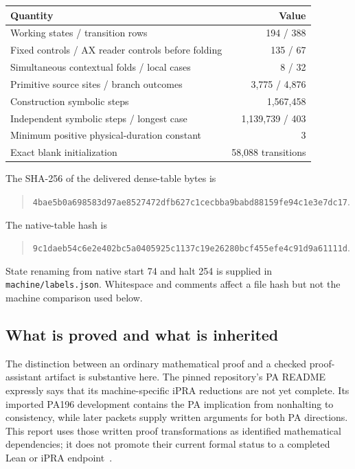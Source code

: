 \documentclass[11pt,letterpaper]{article}
\newcommand{\file}[1]{\nolinkurl{#1}}
\begin{document}
\begin{center}
\begin{tabular}{lr}
\toprule Quantity & Value\\\midrule
Working states / transition rows & 194 / 388\\
Fixed controls / AX reader controls before folding & 135 / 67\\
Simultaneous contextual folds / local cases & 8 / 32\\
Primitive source sites / branch outcomes & 3,775 / 4,876\\
Construction symbolic steps & 1,567,458\\
Independent symbolic steps / longest case & 1,139,739 / 403\\
Minimum positive physical-duration constant & 3\\
Exact blank initialization & 58,088 transitions\\
\bottomrule
\end{tabular}
\end{center}
The SHA-256 of the delivered dense-table bytes is
\begin{quote}\small
\nolinkurl{4bae5b0a698583d97ae8527472dfb627c1cecbba9babd88159fe94c1e3e7dc17}.
\end{quote}
The native-table hash is
\begin{quote}\small
\nolinkurl{9c1daeb54c6e2e402bc5a0405925c1137c19e26280bcf455efe4c91d9a61111d}.
\end{quote}
State renaming from native start 74 and halt 254 is supplied in
\file{machine/labels.json}. Whitespace and comments affect a file hash but
not the machine comparison used below.

\subsection{What is proved and what is inherited}

The distinction between an ordinary mathematical proof and a checked
proof-assistant artifact is substantive here. The pinned repository's PA
README expressly says that its machine-specific iPRA reductions are not yet
complete. Its imported PA196 development contains the PA implication from
nonhalting to consistency, while later packets supply written arguments for
both PA directions. This report uses those written proof transformations
as identified mathematical dependencies; it does not promote their current
formal status to a completed Lean or iPRA endpoint~\cite{pa-readme,upstream}.
\end{document}
